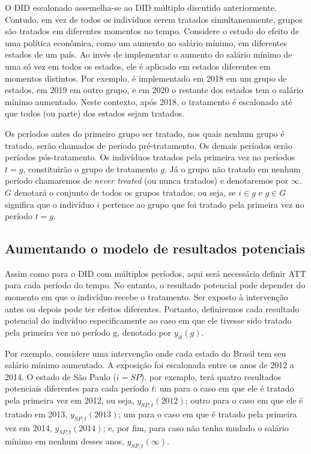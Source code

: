 \documentclass[portugues]{article}
\begin{document}
O DID escalonado assemelha-se ao DID múltiplo discutido anteriormente. Contudo, em vez de todos os indivíduos serem tratados simultaneamente, grupos são tratados em diferentes momentos no tempo. Considere o estudo do efeito de uma política econômica, como um aumento no salário mínimo, em diferentes estados de um país. Ao invés de implementar o aumento do salário mínimo de uma só vez em todos os estados, ele é aplicado em estados diferentes em momentos distintos. Por exemplo, é implementado em 2018 em um grupo de estados, em 2019 em outro grupo, e em 2020 o restante dos estados tem o salário mínimo aumentado. Neste contexto, após 2018, o tratamento é escalonado até que todos (ou parte) dos estados sejam tratados.

Os períodos antes do primeiro grupo ser tratado, nos quais nenhum grupo é tratado, serão chamados de período pré-tratamento. Os demais períodos serão períodos pós-tratamento. Os indivíduos tratados pela primeira vez no períodos $t=g$, constituirão o grupo de tratamento $g$. Já o grupo não tratado em nenhum período chamaremos de \textit{never treated} (ou nunca tratados) e denotaremos por $\infty$. $G$ denotará o conjunto de todos os grupos tratados, ou seja, se $i \in g$ e $g \in G$ significa que o indivíduo $i$ pertence ao grupo que foi tratado pela primeira vez no período $t=g$.

\subsection{Aumentando o modelo de resultados potenciais}

Assim como para o DID com múltiplos períodos, aqui será necessário definir ATT para cada período do tempo. No entanto, o resultado potencial pode depender do momento em que o indivíduo recebe o tratamento. Ser exposto à intervenção antes ou depois pode ter efeitos diferentes. Portanto, definiremos cada resultado potencial do indivíduo especificamente ao caso em que ele tivesse sido tratado pela primeira vez no período g, denotado por $y_{it}(g)$. 

Por exemplo, considere uma intervenção onde cada estado do Brasil tem seu salário mínimo aumentado. A exposição foi escalonada entre os anos de 2012 a 2014. O estado de São Paulo ($i=SP$), por exemplo,  terá quatro resultados potenciais diferentes para cada período $t$: um para o caso em que ele é tratado pela primeira vez em 2012, ou seja, $y_{SP,t}(2012)$; outro para o caso em que ele é tratado em 2013, $y_{SP,t}(2013)$; um para o caso em que é tratado pela primeira vez em 2014, $y_{SP,t}(2014)$; e, por fim, para caso não tenha mudado o salário mínimo em nenhum desses anos, $y_{SP,t}(\infty)$. 
\end{document}
